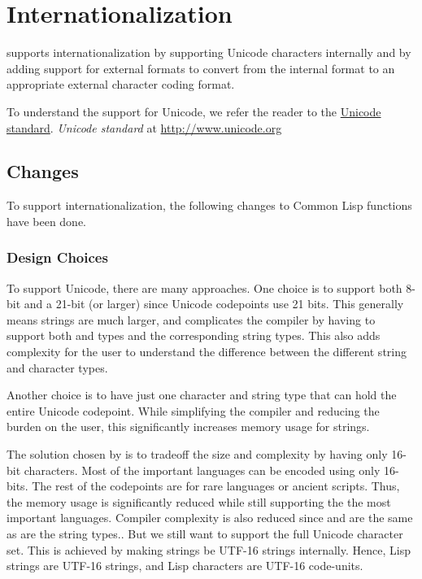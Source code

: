 \chapter{Internationalization}
\label{i18n}

\cmucl{} supports internationalization by supporting Unicode
characters internally and by adding support for external formats to
convert from the internal format to an appropriate external character
coding format.

To understand the support for Unicode, we refer the reader to the
\ifpdf
\href{http://www.unicode.org/}{Unicode standard}.
\else
\emph{Unicode standard} at \url{http://www.unicode.org}
\fi
\section{Changes}

To support internationalization, the following changes to Common Lisp
functions have been done.


\subsection{Design Choices}

To support Unicode, there are many approaches.  One choice is to
support both 8-bit  and a 21-bit (or larger)
 since Unicode codepoints use 21 bits.  This generally
means strings are much larger, and complicates the compiler by having
to support both  and  types and the
corresponding string types.  This also adds complexity for the user to
understand the difference between the different string and character
types.

Another choice is to have just one character and string type that can
hold the entire Unicode codepoint.  While simplifying the compiler and
reducing the burden on the user, this significantly increases memory
usage for strings.

The solution chosen by \cmucl{} is to tradeoff the size and complexity
by having only 16-bit characters.  Most of the important languages can
be encoded using only 16-bits.  The rest of the codepoints are for
rare languages or ancient scripts.  Thus, the memory usage is
significantly reduced while still supporting the the most important
languages.  Compiler complexity is also reduced since 
and  are the same as are the string types..  But we
still want to support the full Unicode character set.  This is
achieved by making strings be UTF-16 strings internally.  Hence, Lisp
strings are UTF-16 strings, and Lisp characters are UTF-16 code-units.


